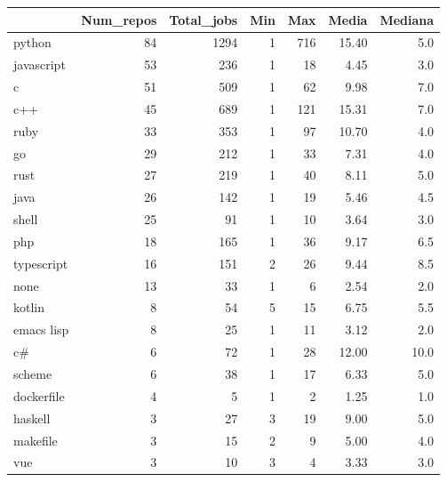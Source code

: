 \begin{tabular}{lrrrrrr}
\toprule
{} &  Num\_repos &  Total\_jobs &  Min &  Max &  Media &  Mediana \\
\midrule
python           &         84 &        1294 &    1 &  716 &  15.40 &      5.0 \\
javascript       &         53 &         236 &    1 &   18 &   4.45 &      3.0 \\
c                &         51 &         509 &    1 &   62 &   9.98 &      7.0 \\
c++              &         45 &         689 &    1 &  121 &  15.31 &      7.0 \\
ruby             &         33 &         353 &    1 &   97 &  10.70 &      4.0 \\
go               &         29 &         212 &    1 &   33 &   7.31 &      4.0 \\
rust             &         27 &         219 &    1 &   40 &   8.11 &      5.0 \\
java             &         26 &         142 &    1 &   19 &   5.46 &      4.5 \\
shell            &         25 &          91 &    1 &   10 &   3.64 &      3.0 \\
php              &         18 &         165 &    1 &   36 &   9.17 &      6.5 \\
typescript       &         16 &         151 &    2 &   26 &   9.44 &      8.5 \\
none             &         13 &          33 &    1 &    6 &   2.54 &      2.0 \\
kotlin           &          8 &          54 &    5 &   15 &   6.75 &      5.5 \\
emacs lisp       &          8 &          25 &    1 &   11 &   3.12 &      2.0 \\
c\#               &          6 &          72 &    1 &   28 &  12.00 &     10.0 \\
scheme           &          6 &          38 &    1 &   17 &   6.33 &      5.0 \\
dockerfile       &          4 &           5 &    1 &    2 &   1.25 &      1.0 \\
haskell          &          3 &          27 &    3 &   19 &   9.00 &      5.0 \\
makefile         &          3 &          15 &    2 &    9 &   5.00 &      4.0 \\
vue              &          3 &          10 &    3 &    4 &   3.33 &      3.0 \\

\end{tabular}
